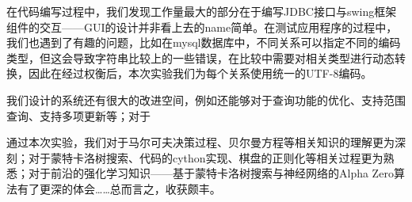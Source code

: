 \documentclass[withoutpreface,bwprint]{cumcmthesis} %
\begin{document}
在代码编写过程中，我们发现工作量最大的部分在于编写JDBC接口与swing框架组件的交互——GUI的设计并非看上去的name简单。在测试应用程序的过程中，我们也遇到了有趣的问题，比如在mysql数据库中，不同关系可以指定不同的编码类型，但这会导致字符串比较上的一些错误，在比较中需要对相关类型进行动态转换，因此在经过权衡后，本次实验我们为每个关系使用统一的UTF-8编码。
 
我们设计的系统还有很大的改进空间，例如还能够对于查询功能的优化、支持范围查询、支持多项更新等；对于


通过本次实验，我们对于马尔可夫决策过程、贝尔曼方程等相关知识的理解更为深刻；对于蒙特卡洛树搜索、代码的cython实现、棋盘的正则化等相关过程更为熟悉；对于前沿的强化学习知识——基于蒙特卡洛树搜索与神经网络的Alpha Zero算法有了更深的体会……总而言之，收获颇丰。




\end{document}

